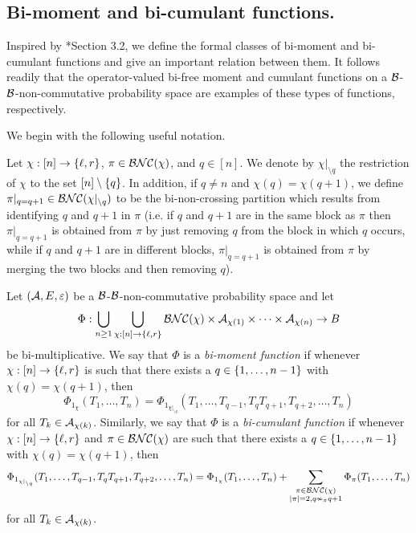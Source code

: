 		\subsection{Bi-moment and bi-cumulant functions.}
		\label{subsec:bimomentandbicumulantfunctions}



		Inspired by \cite{speicher1998combinatorial}*{Section 3.2}, we define the formal classes of bi-moment and bi-cumulant functions and give an important relation between them.
		It follows readily that the operator-valued bi-free moment and cumulant functions on a $\mathcal{B}$-$\mathcal{B}$-non-commutative probability space are examples of these types of functions, respectively.



		We begin with the following useful notation.
		\begin{notation}
			Let $\chi : [n] \to \left\{\ell, r\right\}$, $\pi \in \mathcal{BNC}(\chi)$, and $q \in [n]$.
			We denote by $\chi|_{\setminus q}$ the restriction of $\chi$ to the set $[n] \setminus \left\{q\right\}$.
			In addition, if $q \neq n$ and $\chi(q) = \chi(q+1)$, we define $\pi|_{q = q+1} \in \mathcal{BNC}(\chi|_{\setminus q})$ to be the bi-non-crossing partition which results from identifying $q$ and $q+1$ in $\pi$ (i.e. if $q$ and $q+1$ are in the same block as $\pi$ then $\pi|_{q=q+1}$ is obtained from $\pi$ by just removing $q$ from the block in which $q$ occurs, while if $q$ and $q+1$ are in different blocks, $\pi|_{q=q+1}$ is obtained from $\pi$ by merging the two blocks and then removing $q$).
		\end{notation}

		\begin{definition}
			\label{defnbimomentandbicumulantfunctions}
			Let $(\mathcal{A}, E, \varepsilon)$ be a $\mathcal{B}$-$\mathcal{B}$-non-commutative probability space and let
			\[
				\Phi : \bigcup_{n\geq 1} \bigcup_{\chi : [n] \to \left\{\ell, r\right\}} \mathcal{BNC}(\chi) \times \mathcal{A}_{\chi(1)} \times \cdots \times \mathcal{A}_{\chi(n)} \to B
			\]
			be bi-multiplicative.
			We say that $\Phi$ is a \emph{bi-moment function} if whenever $\chi : [n] \to \left\{\ell, r\right\}$ is such that there exists a $q \in \left\{1,\ldots, n-1\right\}$ with $\chi(q) = \chi(q+1)$, then
			\[
				\Phi_{1_\chi}(T_1, \ldots, T_n) = \Phi_{1_{\chi|_{\setminus q}}}(T_1, \ldots, T_{q-1}, T_qT_{q+1}, T_{q+2},\ldots, T_n)
			\]
			for all $T_k \in \mathcal{A}_{\chi(k)}$.
			Similarly, we say that $\Phi$ is a \emph{bi-cumulant function} if whenever $\chi : [n] \to \left\{\ell, r\right\}$ and $\pi \in \mathcal{BNC}(\chi)$ are such that there exists a $q \in \left\{1,\ldots, n-1\right\}$ with $\chi(q) = \chi(q+1)$, then
			\[
				\Phi_{1_{\chi|_{\setminus q}}}(T_1, \ldots, T_{q-1}, T_qT_{q+1}, T_{q+2},\ldots, T_n) = \Phi_{1_\chi}(T_1, \ldots, T_n) + \sum_{\substack{\pi \in \mathcal{BNC}(\chi)\\ |\pi| =2, q\nsim_\pi q+1}} \Phi_\pi(T_1, \ldots, T_n)
			\]
			for all $T_k \in \mathcal{A}_{\chi(k)}$.
		\end{definition}

